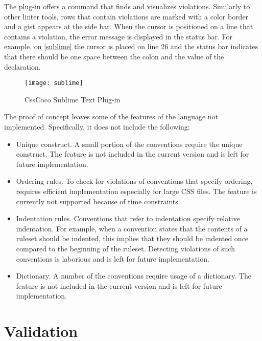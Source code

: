 The plug-in offers a command that finds and visualizes violations. Similarly to
other linter tools, rows that contain violations are marked with a color
border and a gist appears at the side bar. When the cursor is positioned on a
line that contains a violation, the error message is displayed in the status
bar. For example, on \autoref{sublime} the cursor is placed on line 26 and the
status bar indicates that there should be one space between the colon and the
value of the declaration.

\begin{figure}[h]
  \centering
  \caption{
    \label{sublime}
    CssCoco Sublime Text Plug-in}
  \texttt{[image: sublime]}
\end{figure}

The proof of concept leaves some of the features of the language not implemented. Specifically, it does not include the following:

\begin{itemize}

\item Unique construct. A small portion of the conventions require the unique construct. The feature is not included in the current version and is left for future implementation.

\item Ordering rules. To check for violations of conventions that specify ordering, requires efficient implementation especially for large CSS files. The feature is currently not supported because of time constraints. 

\item Indentation rules. Conventions that refer to indentation specify relative indentation. For example, when a convention states that the contents of a ruleset should be indented, this implies that they should be indented once compared to the beginning of the ruleset. Detecting violations of such conventions is laborious and is left for future implementation.

\item Dictionary. A number of the conventions require usage of a dictionary. The feature is not included in the current version and is left for future implementation.

\end{itemize}

\section{Validation}

